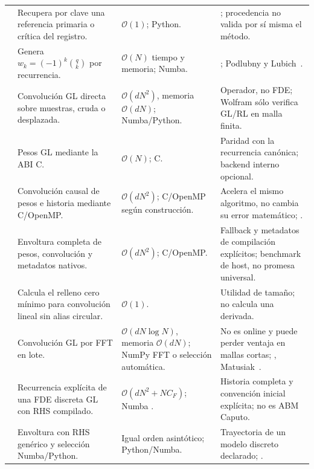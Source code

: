 \begin{center}
\begin{longtable}{@{}L{0.23\textwidth}L{0.23\textwidth}L{0.23\textwidth}L{0.23\textwidth}@{}}
\addlinespace
{} & Recupera por clave una referencia primaria o crítica del registro. & \(\mathcal O(1)\); Python. & ; procedencia no valida por sí misma el método. \\
\addlinespace
{} & Genera \(w_k=(-1)^k\binom{q}{k}\) por recurrencia. & \(\mathcal O(N)\) tiempo y memoria; Numba. & ; Podlubny y Lubich~\cite{Podlubny1999,Lubich1986}. \\
\addlinespace
{} & Convolución GL directa sobre muestras, cruda o desplazada. & \(\mathcal O(dN^2)\), memoria \(\mathcal O(dN)\); Numba/Python. & Operador, no FDE; Wolfram sólo verifica GL/RL en malla finita. \\
\addlinespace
{} & Pesos GL mediante la ABI C. & \(\mathcal O(N)\); C. & Paridad con la recurrencia canónica; backend interno opcional. \\
\addlinespace
{} & Convolución causal de pesos e historia mediante C/OpenMP. & \(\mathcal O(dN^2)\); C/OpenMP según construcción. & Acelera el mismo algoritmo, no cambia su error matemático; . \\
\addlinespace
{} & Envoltura completa de pesos, convolución y metadatos nativos. & \(\mathcal O(dN^2)\); C/OpenMP. & Fallback y metadatos de compilación explícitos; benchmark de host, no promesa universal. \\
\addlinespace
{} & Calcula el relleno cero mínimo para convolución lineal sin alias circular. & \(\mathcal O(1)\). & Utilidad de tamaño; no calcula una derivada. \\
\addlinespace
{} & Convolución GL por FFT en lote. & \(\mathcal O(dN\log N)\), memoria \(\mathcal O(dN)\); NumPy FFT o selección automática. & No es online y puede perder ventaja en mallas cortas; , Matusiak~\cite{Matusiak2020}. \\
\addlinespace
{} & Recurrencia explícita de una FDE discreta GL con RHS compilado. & \(\mathcal O(dN^2+NC_F)\); Numba . & Historia completa y convención inicial explícita; no es ABM Caputo. \\
\addlinespace
{} & Envoltura con RHS genérico y selección Numba/Python. & Igual orden asintótico; Python/Numba. & Trayectoria de un modelo discreto declarado; . \\

\end{longtable}
\end{center}
